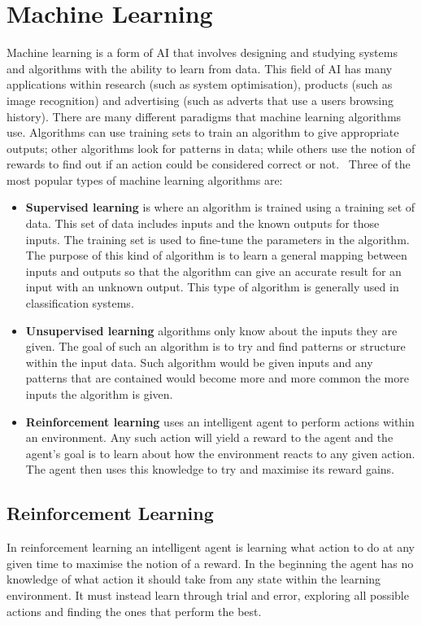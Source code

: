 \chapter{Machine Learning}\label{machine learning}
Machine learning is a form of \ac{AI} that involves designing and studying systems and algorithms with the ability to learn from data. This field of AI has many applications within research (such as system optimisation), products (such as image recognition) and advertising (such as adverts that use a users browsing history). There are many different paradigms that machine learning algorithms use. Algorithms can use training sets to train an algorithm to give appropriate outputs; other algorithms look for patterns in data; while others use the notion of rewards to find out if an action could be considered correct or not.~\cite{alpaydin2010introduction} Three of the most popular types of machine learning algorithms are:

\begin{itemize}
  \item \textbf{Supervised learning} is where an algorithm is trained using a training set of data. This set of data includes inputs and the known outputs for those inputs. The training set is used to fine-tune the parameters in the algorithm. The purpose of this kind of algorithm is to learn a general mapping between inputs and outputs so that the algorithm can give an accurate result for an input with an unknown output. This type of algorithm is generally used in classification systems.  
  \item \textbf{Unsupervised learning} algorithms only know about the inputs they are given. The goal of such an algorithm is to try and find patterns or structure within the input data. Such algorithm would be given inputs and any patterns that are contained would become more and more common the more inputs the algorithm is given.
  \item \textbf{Reinforcement learning} uses an intelligent agent to perform actions within an environment. Any such action will yield a reward to the agent and the agent's goal is to learn about how the environment reacts to any given action. The agent then uses this knowledge to try and maximise its reward gains.
\end{itemize}
\section{Reinforcement Learning}\label{reinforcement learning}
In reinforcement learning an intelligent agent is learning what action to do at any given time to maximise the notion of a reward. In the beginning the agent has no knowledge of what action it should take from any state within the learning environment. It must instead learn through trial and error, exploring all possible actions and finding the ones that perform the best.

